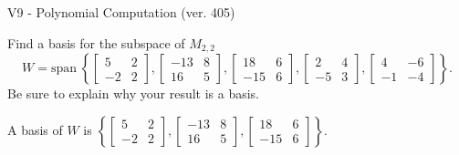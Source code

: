 \begin{exercise}
  \begin{exerciseTitle}V9 - Polynomial Computation (ver. 405)\end{exerciseTitle}
  \begin{exerciseStatement}
    Find a basis for the subspace of \(M_{2,2}\) 
\[W=\mathrm{span}\ \left\{\left[\begin{array}{cc}
5 & 2 \\
-2 & 2
\end{array}\right] , \left[\begin{array}{cc}
-13 & 8 \\
16 & 5
\end{array}\right] , \left[\begin{array}{cc}
18 & 6 \\
-15 & 6
\end{array}\right] , \left[\begin{array}{cc}
2 & 4 \\
-5 & 3
\end{array}\right] , \left[\begin{array}{cc}
4 & -6 \\
-1 & -4
\end{array}\right]\right\}.\]
 Be sure to explain why your result is a basis.


  \end{exerciseStatement}
  \begin{exerciseAnswer}
   A basis of \(W\) is  \(\left\{\left[\begin{array}{cc}
5 & 2 \\
-2 & 2
\end{array}\right] , \left[\begin{array}{cc}
-13 & 8 \\
16 & 5
\end{array}\right] , \left[\begin{array}{cc}
18 & 6 \\
-15 & 6
\end{array}\right]\right\}\).
  


  \end{exerciseAnswer}
\end{exercise}